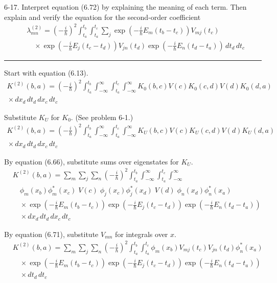 \documentclass[12pt]{article}
\begin{document}
6-17.
Interpret equation (6.72) by explaining the meaning of each term.
Then explain and verify the equation for the second-order coefficient
\begin{align*}
&\lambda_{mn}^{(2)}=\left(-\frac{i}{\hbar}\right)^2
\int_{t_a}^{t_b}
\int_{t_a}^{t_c}
\sum_j
\exp\left(-\frac{i}{\hbar}E_m(t_b-t_c)\right)V_{mj}(t_c)
\\
&\quad{}\times\exp\left(-\frac{i}{\hbar}E_j(t_c-t_d)\right)V_{jn}(t_d)
\exp\left(-\frac{i}{\hbar}E_n(t_d-t_a)\right)\,dt_d\,dt_c
\tag{6.74}
\end{align*}

\bigskip
\hrule

\bigskip
Start with equation (6.13).
\begin{multline*}
K^{(2)}(b,a)=\left(-\frac{i}{\hbar}\right)^2
\int_{t_a}^{t_b}
\int_{-\infty}^\infty
\int_{t_a}^{t_c}
\int_{-\infty}^\infty
K_0(b,c)V(c)K_0(c,d)V(d)K_0(d,a)
\\
{}\times dx_d\,dt_d\,dx_c\,dt_c
\end{multline*}

Substitute $K_U$ for $K_0$.
(See problem 6-1.)
\begin{multline*}
K^{(2)}(b,a)=\left(-\frac{i}{\hbar}\right)^2
\int_{t_a}^{t_b}
\int_{-\infty}^\infty
\int_{t_a}^{t_c}
\int_{-\infty}^\infty
K_U(b,c)V(c)K_U(c,d)V(d)K_U(d,a)
\\
{}\times dx_d\,dt_d\,dx_c\,dt_c
\end{multline*}

By equation (6.66), substitute sums over eigenstates for $K_U$.
\begin{align*}
&K^{(2)}(b,a)=\sum_m\sum_j\sum_n
\left(-\frac{i}{\hbar}\right)^2
\int_{t_a}^{t_b}
\int_{-\infty}^\infty
\int_{t_a}^{t_c}
\int_{-\infty}^\infty
\\
&\quad\phi_m(x_b)\phi_m^*(x_c)\;V(c)\;\phi_j(x_c)\phi_j^*(x_d)\;V(d)\;\phi_n(x_d)\phi_n^*(x_a)
\\
&\quad\times
\exp\left(-\frac{i}{\hbar}E_m(t_b-t_c)\right)
\exp\left(-\frac{i}{\hbar}E_j(t_c-t_d)\right)
\exp\left(-\frac{i}{\hbar}E_n(t_d-t_a)\right)
\\
&\quad{}\times dx_d\,dt_d\,dx_c\,dt_c
\end{align*}

By equation (6.71), substitute $V_{mn}$ for integrals over $x$.
\begin{align*}
&K^{(2)}(b,a)=\sum_m\sum_j\sum_n
\left(-\frac{i}{\hbar}\right)^2
\int_{t_a}^{t_b}
\int_{t_a}^{t_c}
\phi_m(x_b)V_{mj}(t_c)V_{jn}(t_d)\phi_n^*(x_a)
\\
&\quad\times
\exp\left(-\frac{i}{\hbar}E_m(t_b-t_c)\right)
\exp\left(-\frac{i}{\hbar}E_j(t_c-t_d)\right)
\exp\left(-\frac{i}{\hbar}E_n(t_d-t_a)\right)
\\
&\quad{}\times dt_d\,dt_c
\end{align*}
\end{document}

